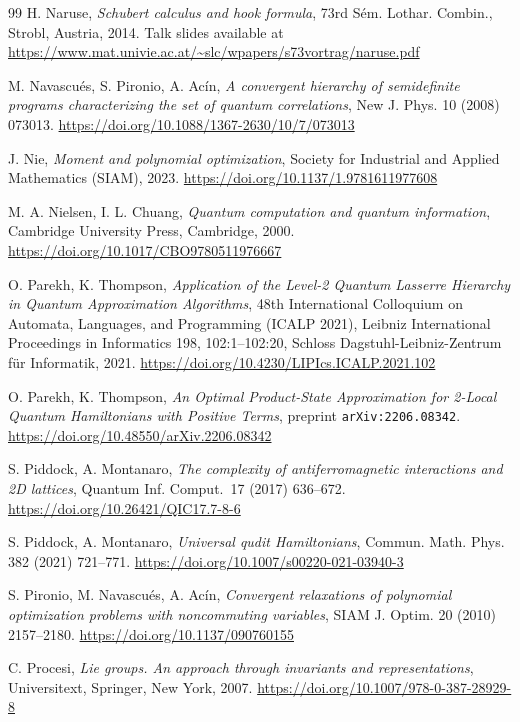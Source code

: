 \documentclass[12pt,dvipsnames,accepted=2016-08-18,a4paper,onecolumn]{quantumarticle}
\numberwithin{equation}{section}
\theoremstyle{definition}
\begin{document}
\begin{thebibliography}{99}
H. Naruse, 
\textit{Schubert calculus and hook formula},
73rd S{\'e}m. Lothar. Combin., Strobl, Austria, 2014. Talk slides available at 
\url{https://www.mat.univie.ac.at/~slc/wpapers/s73vortrag/naruse.pdf}

M. Navascu\'es, S. Pironio, A. Ac\'in,
\textit{A convergent hierarchy of semidefinite programs characterizing the set of quantum correlations},
New J. Phys. 10 (2008) 073013. \url{https://doi.org/10.1088/1367-2630/10/7/073013}

J. Nie,
\textit{ Moment and polynomial optimization}, Society for Industrial and Applied Mathematics (SIAM), 2023. \url{https://doi.org/10.1137/1.9781611977608}


M. A. Nielsen, I. L. Chuang, 
\textit{Quantum computation and quantum information},
Cambridge University Press, Cambridge, 2000. \url{https://doi.org/10.1017/CBO9780511976667}

 O. Parekh, K. Thompson, \textit{Application of the Level-2 Quantum
 Lasserre Hierarchy in Quantum Approximation Algorithms}, 48th International Colloquium on Automata, Languages, and Programming (ICALP 2021),  Leibniz International Proceedings in Informatics 198, 102:1--102:20, Schloss Dagstuhl-Leibniz-Zentrum f\"ur Informatik, 2021.
 \url{https://doi.org/10.4230/LIPIcs.ICALP.2021.102}

 O. Parekh, K. Thompson, \textit{An Optimal Product-State Approximation for 2-Local Quantum Hamiltonians with Positive Terms}, preprint \texttt{arXiv:2206.08342}. \url{https://doi.org/10.48550/arXiv.2206.08342}

S. Piddock, A. Montanaro, \textit{The complexity of antiferromagnetic interactions and 2D lattices}, Quantum Inf. Comput.~17 (2017) 636--672. \url{https://doi.org/10.26421/QIC17.7-8-6}

S. Piddock, A. Montanaro, 
\textit{Universal qudit Hamiltonians}, 
Commun. Math. Phys. 382 (2021) 721--771.
\url{https://doi.org/10.1007/s00220-021-03940-3}


S. Pironio, M. Navascu\'es, A. Ac\'in, 
\textit{Convergent relaxations of polynomial optimization problems with noncommuting variables}, 
SIAM J. Optim. 20 (2010) 2157--2180.
\url{https://doi.org/10.1137/090760155}


C. Procesi, 
\textit{Lie groups. An approach through invariants and representations}, 
Universitext, Springer, New York, 2007.
\url{https://doi.org/10.1007/978-0-387-28929-8}


\end{thebibliography}
\end{document}
